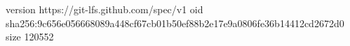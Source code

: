 version https://git-lfs.github.com/spec/v1
oid sha256:9c656e056668089a448cf67cb01b50ef88b2e17e9a0806fe36b14412cd2672d0
size 120552
